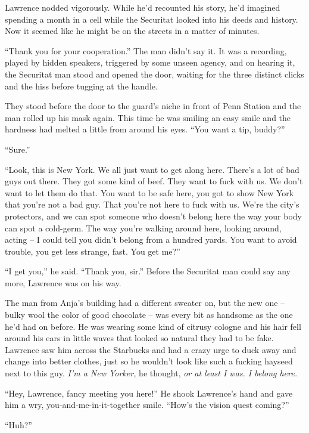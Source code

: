 Lawrence nodded vigorously. While he'd recounted his story, he'd 
imagined spending a month in a cell while the Securitat looked into his 
deeds and history. Now it seemed like he might be on the streets in a 
matter of minutes.

“Thank you for your cooperation.” The man didn't say it. It was a 
recording, played by hidden speakers, triggered by some unseen agency, 
and on hearing it, the Securitat man stood and opened the door, waiting 
for the three distinct clicks and the hiss before tugging at the handle.

They stood before the door to the guard's niche in front of Penn 
Station and the man rolled up his mask again. This time he was smiling 
an easy smile and the hardness had melted a little from around his 
eyes. “You want a tip, buddy?”

“Sure.”

“Look, this is New York. We all just want to get along here. There's 
a lot of bad guys out there. They got some kind of beef. They want to 
fuck with us. We don't want to let them do that. You want to be safe 
here, you got to show New York that you're not a bad guy. That you're 
not here to fuck with us. We're the city's protectors, and we can spot 
someone who doesn't belong here the way your body can spot a cold-germ. 
The way you're walking around here, looking around, acting -- I could 
tell you didn't belong from a hundred yards. You want to avoid trouble, 
you get less strange, fast. You get me?”

“I get you,” he said. “Thank you, sir.” Before the Securitat 
man could say any more, Lawrence was on his way.

\tb

The man from Anja's building had a different sweater on, but the new 
one -- bulky wool the color of good chocolate -- was every bit as 
handsome as the one he'd had on before. He was wearing some kind of 
citrusy cologne and his hair fell around his ears in little waves that 
looked so natural they had to be fake. Lawrence saw him across the 
Starbucks and had a crazy urge to duck away and change into better 
clothes, just so he wouldn't look like such a fucking hayseed next to 
this guy. \emph{I'm a New Yorker,} he thought, \emph{or at least I was. 
I belong here.}

“Hey, Lawrence, fancy meeting you here!” He shook Lawrence's hand 
and gave him a wry, you-and-me-in-it-together smile. “How's the 
vision quest coming?”

“Huh?”

